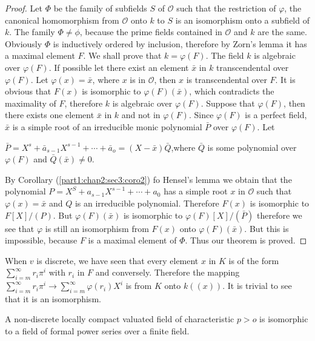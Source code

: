 \begin{proof}
  Let $\Phi$ be the family of subfields $S$ of $\mathscr{O}$ such that
  the restriction of $\varphi$, the canonical homomorphism from
  $\mathscr{O}$ onto $k$ to $S$ is an isomorphism onto a subfield of
  $k$. The family $\Phi \neq \phi$, because the prime fields contained
  in $\mathscr{O}$ and $k$ are the same. Obviously $\Phi$ is
  inductively ordered by inclusion, therefore by Zorn's lemma it has a
  maximal element $F$. We shall prove that $k=\varphi(F)$. The field
  $k$ is algebraic over $\varphi(F)$. If possible let there exist an
  element $\bar{x}$ in $k$ transcendental over $\varphi(F)$. Let
  $\varphi(x) = \bar{x}$, where $x$ is in $\mathscr{O}$, then $x$ is
  transcendental over $F$. It is obvious that $F(x)$ is isomorphic to
  $\varphi(F) (\bar {x})$, which contradicts the maximality of $F$,
  therefore $k$ is algebraic over $\varphi(F)$. Suppose that
  $\varphi(F)$, then there exists one element $\bar{x}$ in $k$ and not
  in $\varphi(F)$. Since $\varphi(F)$ is a perfect field, $\bar{x}$ is
  a simple root of an irreducible monic polynomial $\bar{P}$ over
  $\varphi(F)$. Let 

  $\bar{P}=X^s + \bar{a}_{s-1} X^{s-1}+\cdots+ \bar{a}_o = (X-
  \bar{x})\bar{Q}$,\pageoriginale where $\bar{Q}$ is some polynomial over
  $\varphi(F)$ and $\bar{Q}(\bar{x})\neq 0$. 
  
  By Corollary (\ref{part1:chap2:sec3:coro2}) fo Hensel's lemma we obtain that the polynomial 
  $P= X^S +a _{s-1} X^{s-1} + \cdots+ a_0$ has a simple root $x$ in
  $\mathscr{O}$ such that $\varphi(x) = \bar{x}$ and $Q$ is an
  irreducible polynomial. Therefore $F(x)$ is isomorphic to
  $F[X]/(P)$. But $\varphi(F) (\bar{x})$ is isomorphic to $\varphi(F)
  [X]/ (\bar{P})$ therefore we see that $\varphi$ is still an
  isomorphism from $F(x)$ onto $\varphi(F) (\bar{x})$. But this is
  impossible, because $F$ is a maximal element of $\Phi$. Thus our
  theorem is proved. 
\end{proof}

When $v$ is discrete, we have seen that every element $x$ in $K$ is of
the form $\sum\limits^\infty_{i = m}r_i \pi^i$ with $r_i$ in $F$ and
conversely. Therefore the mapping $\sum\limits^\infty_{i = m}r_i \pi^i
\to \sum\limits^\infty_{i = m} \varphi(r_i) X^i$ is from $K$ onto
$k((x))$. It is trivial to see that it is an isomorphism. 

\begin{coro*}%
  A non-discrete locally compact valuated field of characteristic $p >
  o$ is isomorphic to a field of formal power series over a finite
  field. 
\end{coro*}

